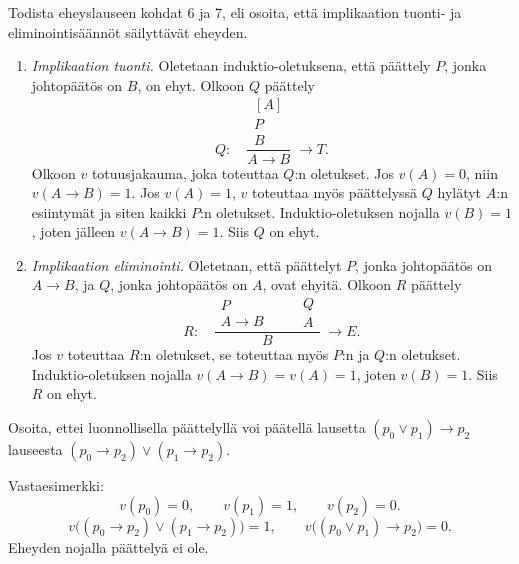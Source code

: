 \documentclass[11pt,a4paper]{amsart}
\begin{document}
\begin{exercise}
  Todista eheyslauseen kohdat 6 ja 7, eli osoita, että implikaation tuonti- ja
  eliminointisäännöt säilyttävät eheyden.
\end{exercise}

\begin{solution}
  \begin{enumerate}[label=\arabic*.,start=6]
    \item \emph{Implikaation tuonti.} Oletetaan induktio-oletuksena,
      että päättely \(P\), jonka johtopäätös on \(B\), on ehyt.
      Olkoon \(Q\) päättely
      \[
        Q:\quad
        \dfrac{
          \begin{array}{c}[A]\\P\\B
        \end{array}}{A\to B}\;\to T.
      \]
      Olkoon \(v\) totuusjakauma, joka toteuttaa \(Q\):n oletukset.
      Jos \(v(A)=0\), niin \(v(A\to B)=1\). Jos \(v(A)=1\),
      \(v\) toteuttaa myös päättelyssä \(Q\) hylätyt \(A\):n
      esiintymät ja siten kaikki \(P\):n oletukset. Induktio-oletuksen
      nojalla \(v(B)=1\), joten jälleen \(v(A\to B)=1\). Siis
      \(Q\) on ehyt.

    \item \emph{Implikaation eliminointi.} Oletetaan, että päättelyt
      \(P\), jonka johtopäätös on \(A\to B\), ja \(Q\), jonka
      johtopäätös on \(A\), ovat ehyitä. Olkoon \(R\) päättely
      \[
        R:\quad
        \dfrac{
          \begin{array}{c}P\\A\to B
          \end{array}
          \qquad
          \begin{array}{c}Q\\A
        \end{array}}{B}\;\to E.
      \]
      Jos \(v\) toteuttaa \(R\):n oletukset, se toteuttaa myös
      \(P\):n ja \(Q\):n oletukset. Induktio-oletuksen nojalla
      \(v(A\to B)=v(A)=1\), joten \(v(B)=1\). Siis \(R\) on ehyt.
  \end{enumerate}
\end{solution}

\begin{exercise}
  Osoita, ettei luonnollisella päättelyllä voi päätellä lausetta
  \((p_0 \lor p_1) \to p_2\) lauseesta \((p_0 \to p_2) \lor (p_1 \to p_2)\).
\end{exercise}

\begin{solution}
  Vastaesimerkki:
  \[
    v(p_0)=0,\qquad v(p_1)=1,\qquad v(p_2)=0.
  \]
  \[
    v\bigl((p_0\to p_2)\lor(p_1\to p_2)\bigr)=1,
    \qquad v\bigl((p_0\lor p_1)\to p_2\bigr)=0.
  \]
  Eheyden nojalla päättelyä ei ole.
\end{solution}
\end{document}
